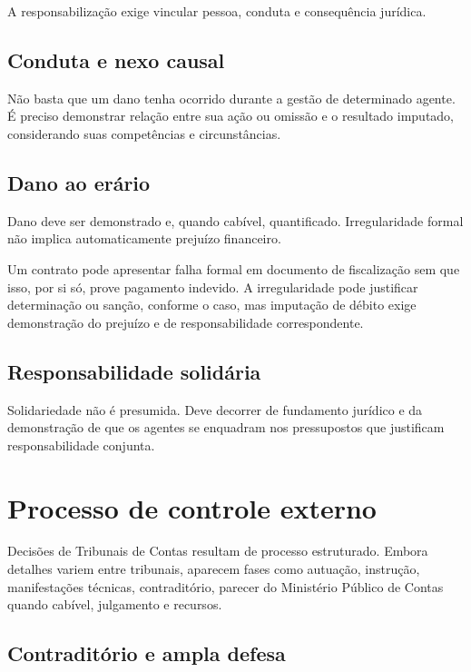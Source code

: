 A responsabilização exige vincular pessoa, conduta e consequência jurídica.

\subsection{Conduta e nexo causal}

Não basta que um dano tenha ocorrido durante a gestão de determinado agente. É preciso demonstrar relação entre sua ação ou omissão e o resultado imputado, considerando suas competências e circunstâncias.

\subsection{Dano ao erário}

Dano deve ser demonstrado e, quando cabível, quantificado. Irregularidade formal não implica automaticamente prejuízo financeiro.

\begin{exemplo}
Um contrato pode apresentar falha formal em documento de fiscalização sem que isso, por si só, prove pagamento indevido. A irregularidade pode justificar determinação ou sanção, conforme o caso, mas imputação de débito exige demonstração do prejuízo e de responsabilidade correspondente.
\end{exemplo}

\subsection{Responsabilidade solidária}

Solidariedade não é presumida. Deve decorrer de fundamento jurídico e da demonstração de que os agentes se enquadram nos pressupostos que justificam responsabilidade conjunta.

\section{Processo de controle externo}

Decisões de Tribunais de Contas resultam de processo estruturado. Embora detalhes variem entre tribunais, aparecem fases como autuação, instrução, manifestações técnicas, contraditório, parecer do Ministério Público de Contas quando cabível, julgamento e recursos.

\subsection{Contraditório e ampla defesa}


